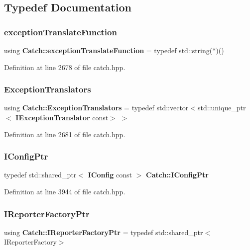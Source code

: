 \subsection{Typedef Documentation}
\mbox{\label{namespace_catch_ae8d8673884dc36b98875106322a2a37b}} 
\subsubsection{exceptionTranslateFunction}
{\footnotesize\ttfamily using \textbf{ Catch\+::exception\+Translate\+Function} = typedef std\+::string($\ast$)()}



Definition at line 2678 of file catch.\+hpp.

\mbox{\label{namespace_catch_a7ad07967e688fdc03cf784f58be4b741}} 
\subsubsection{ExceptionTranslators}
{\footnotesize\ttfamily using \textbf{ Catch\+::\+Exception\+Translators} = typedef std\+::vector$<$std\+::unique\+\_\+ptr$<$\textbf{ I\+Exception\+Translator} const$>$ $>$}



Definition at line 2681 of file catch.\+hpp.

\mbox{\label{namespace_catch_afd20a5d4f9d2f4d525db81a7765367b0}} 
\subsubsection{IConfigPtr}
{\footnotesize\ttfamily typedef std\+::shared\+\_\+ptr$<$ \textbf{ I\+Config} const  $>$ \textbf{ Catch\+::\+I\+Config\+Ptr}}



Definition at line 3944 of file catch.\+hpp.

\mbox{\label{namespace_catch_ad1b36ac40c2739e52fd453dcdddf0d09}} 
\subsubsection{IReporterFactoryPtr}
{\footnotesize\ttfamily using \textbf{ Catch\+::\+I\+Reporter\+Factory\+Ptr} = typedef std\+::shared\+\_\+ptr$<$I\+Reporter\+Factory$>$}



